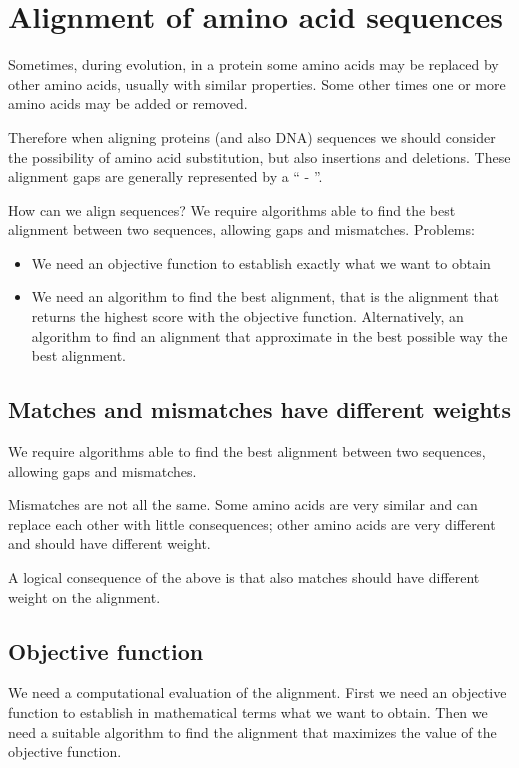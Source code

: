 \section{Alignment of amino acid sequences}

Sometimes, during evolution, in a protein some amino acids may be replaced
by other amino acids, usually with similar properties. Some other times one or
more amino acids may be added or removed.

Therefore when aligning proteins (and also DNA) sequences we should consider
the possibility of amino acid substitution, but also insertions and deletions.
These alignment gaps are generally represented by a `` - ''.

How can we align sequences?
We require algorithms able to find the best alignment between two sequences,
allowing gaps and mismatches.
Problems:
\begin{itemize}
  \item We need an objective function to establish exactly what we want to
obtain
  \item We need an algorithm to find the best alignment, that is the alignment
that returns the highest score with the objective function. Alternatively, an
algorithm to find an alignment that approximate in the best possible way the
best alignment.
\end{itemize}

\subsection{Matches and mismatches have different weights}

We require algorithms able to find the best alignment between two sequences,
allowing gaps and mismatches.

Mismatches are not all the same. Some amino acids are very similar and can
replace each other with little consequences; other amino acids are very
different and should have different weight.

A logical consequence of the above is that also matches should have different
weight on the alignment.

\subsection{Objective function}

We need a computational evaluation of the alignment. First we need an objective
function to establish in mathematical terms what we want to obtain.
Then we need a suitable algorithm to find the alignment that maximizes the
value of the objective function.

